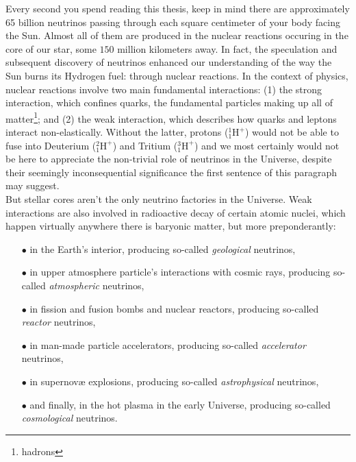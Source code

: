 \begin{intro}
{\color{purple}E}very second you spend reading this thesis, keep in mind there are approximately 65 billion neutrinos passing through each square centimeter of your body facing the Sun. Almost all of them are produced in the nuclear reactions occuring in the core of our star, some $150$ million kilometers away. In fact, the speculation and subsequent discovery of neutrinos enhanced our understanding of the way the Sun burns its Hydrogen fuel: through nuclear reactions. In the context of physics, nuclear reactions involve two main fundamental interactions: (1) the strong interaction, which confines quarks, the fundamental particles making up all of matter\footnote{hadrons}; and (2) the weak interaction, which describes how quarks and leptons interact non-elastically. Without the latter, protons ($^{1}_{1}\mathrm{H}^{+}$) would not be able to fuse into Deuterium ($^{2}_{1}\mathrm{H}^{+}$) and Tritium ($^{3}_{1}\mathrm{H}^{+}$) and we most certainly would not be here to appreciate the non-trivial role of neutrinos in the Universe, despite their seemingly inconsequential significance the first sentence of this paragraph may suggest. \\

But stellar cores aren't the only neutrino factories in the Universe. Weak interactions are also involved in radioactive decay of certain atomic nuclei, which happen virtually anywhere there is baryonic matter, but more preponderantly: \\

\begin{itemize}
\item[$\bullet$] in the Earth's interior, producing so-called \textit{geological} neutrinos, \\
\item[$\bullet$] in upper atmosphere particle's interactions with cosmic rays, producing so-called \textit{atmospheric} neutrinos, \\
\item[$\bullet$] in fission and fusion bombs and nuclear reactors, producing so-called \textit{reactor} neutrinos, \\
\item[$\bullet$] in man-made particle accelerators, producing so-called \textit{accelerator} neutrinos, \\
\item[$\bullet$] in supernov{\ae} explosions, producing so-called \textit{astrophysical} neutrinos, \\
\item[$\bullet$] and finally, in the hot plasma in the early Universe, producing so-called \textit{cosmological} neutrinos. \\
\end{itemize} 


\end{intro}
